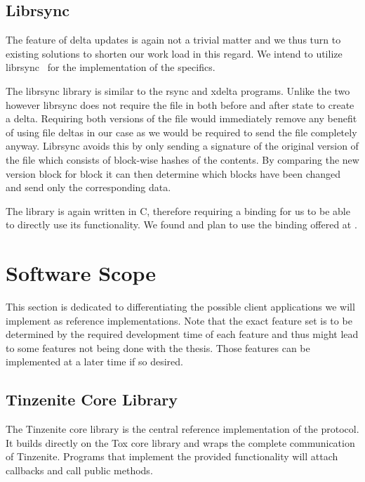 \subsection{Librsync}

The feature of delta updates is again not a trivial matter and we thus turn to existing solutions to shorten our work load in this regard.
We intend to utilize librsync~\cite{web:site:librsync} for the implementation of the specifics.

The librsync library is similar to the rsync and xdelta programs.
Unlike the two however librsync does not require the file in both before and after state to create a delta.
Requiring both versions of the file would immediately remove any benefit of using file deltas in our case as we would be required to send the file completely anyway.
Librsync avoids this by only sending a signature of the original version of the file which consists of block-wise hashes of the contents.
By comparing the new version block for block it can then determine which blocks have been changed and send only the corresponding data.

The library is again written in C, therefore requiring a binding for us to be able to directly use its functionality.
We found and plan to use the binding offered at \cite{web:site:librsync:golang}.

\section{Software Scope}
\label{sec:Software Scope}

This section is dedicated to differentiating the possible client applications we will implement as reference implementations.
Note that the exact feature set is to be determined by the required development time of each feature and thus might lead to some features not being done with the thesis.
Those features can be implemented at a later time if so desired.

\subsection{Tinzenite Core Library}

The Tinzenite core library is the central reference implementation of the protocol.
It builds directly on the Tox core library and wraps the complete communication of Tinzenite.
Programs that implement the provided functionality will attach callbacks and call public methods.

